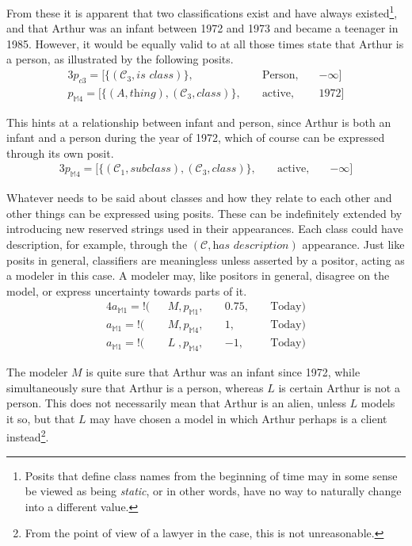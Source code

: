 \documentclass[sfsidenotes,nobib,twoside,symmetric]{tufte-handout}
\newcommand{\assert}{\text{!}}
\begin{document}
From these it is apparent that two classifications exist and have always existed\footnote{Posits that define class names from the beginning of time may in some sense be viewed as being \emph{static}, or in other words, have no way to naturally change into a different value.}, and that Arthur was an infant between 1972 and 1973 and became a teenager in 1985. However, it would be equally valid to at all those times state that Arthur is a person, as illustrated by the following posits. 
\begin{alignat*}{3}
p_{c3} = [\{(\mathcal{C}_3, \textit{is class})\},\;&& \textrm{Person},\;&& -\infty] \\
p_{\mathbb{M}4} = [\{(A, \textit{thing}), (\mathcal{C}_3, \textit{class})\},\;&& \textrm{active},\;&& \textrm{1972}] 
\end{alignat*}

This hints at a relationship between infant and person, since Arthur is both an infant and a person during the year of 1972, which of course can be expressed through its own posit.
\begin{alignat*}{3}
p_{\mathbb{M}4} = [\{(\mathcal{C}_1, \textit{subclass}), (\mathcal{C}_3, \textit{class})\},\;&& \textrm{active},\;&& -\infty] 
\end{alignat*}

Whatever needs to be said about classes and how they relate to each other and other things can be expressed using posits. These can be indefinitely extended by introducing new reserved strings used in their appearances. Each class could have description, for example, through the $(\mathcal{C}, \textit{has description})$ appearance. Just like posits in general, classifiers are meaningless unless asserted by a positor, acting as a modeler in this case. A modeler may, like positors in general, disagree on the model, or express uncertainty towards parts of it. 
\begin{alignat*}{4}
a_{\mathbb{M}1} = \assert(&&M, p_{\mathbb{M}1},\;&& 0.75,\;&& \textrm{Today}) \\
a_{\mathbb{M}1} = \assert(&&M, p_{\mathbb{M}4},\;&& 1,\;&& \textrm{Today}) \\
a_{\mathbb{M}1} = \assert(&&L\;, p_{\mathbb{M}4},\;&& -1,\;&& \textrm{Today}) 
\end{alignat*}

The modeler $M$ is quite sure that Arthur was an infant since 1972, while simultaneously sure that Arthur is a person, whereas $L$ is certain Arthur is not a person. This does not necessarily mean that Arthur is an alien, unless $L$ models it so, but that $L$ may have chosen a model in which Arthur perhaps is a client instead\footnote{From the point of view of a lawyer in the case, this is not unreasonable.}. 
\end{document}
